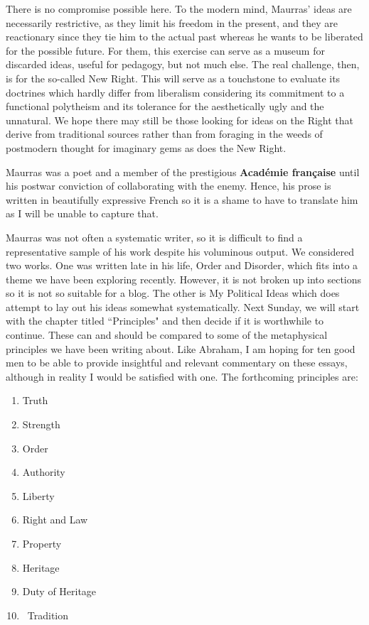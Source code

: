 There is no compromise possible here. To the modern mind, Maurras' ideas are necessarily restrictive, as they limit his freedom in the present, and they are reactionary since they tie him to the actual past whereas he wants to be liberated for the possible future. For them, this exercise can serve as a museum for discarded ideas, useful for pedagogy, but not much else. The real challenge, then, is for the so-called New Right. This will serve as a touchstone to evaluate its doctrines which hardly differ from liberalism considering its commitment to a functional polytheism and its tolerance for the aesthetically ugly and the unnatural. We hope there may still be those looking for ideas on the Right that derive from traditional sources rather than from foraging in the weeds of postmodern thought for imaginary gems as does the New Right.

Maurras was a poet and a member of the prestigious \textbf{Académie française} until his postwar conviction of collaborating with the enemy. Hence, his prose is written in beautifully expressive French so it is a shame to have to translate him as I will be unable to capture that.

Maurras was not often a systematic writer, so it is difficult to find a representative sample of his work despite his voluminous output. We considered two works. One was written late in his life, Order and Disorder, which fits into a theme we have been exploring recently. However, it is not broken up into sections so it is not so suitable for a blog. The other is My Political Ideas which does attempt to lay out his ideas somewhat systematically. Next Sunday, we will start with the chapter titled ``Principles" and then decide if it is worthwhile to continue. These can and should be compared to some of the metaphysical principles we have been writing about. Like Abraham, I am hoping for ten good men to be able to provide insightful and relevant commentary on these essays, although in reality I would be satisfied with one. The forthcoming principles are:

\begin{enumerate}
\item Truth 
\item Strength 
\item Order 
\item Authority 
\item Liberty 
\item Right and Law 
\item Property 
\item Heritage 
\item Duty of Heritage 
\item \ Tradition 
\end{enumerate}


